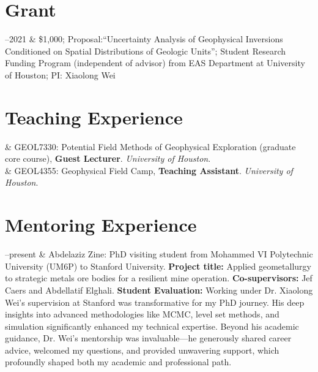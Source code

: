 \documentclass[11pt, a4paper]{article}
\newcommand{\Duration}[2]{\fontsize{10pt}{0}\selectfont #1--#2}
\newcommand{\Year}[1]{\fontsize{10pt}{0}\selectfont #1}
\begin{document}
\section*{Grant}
\begin{EntriesTable}
	
	\Duration{2020}{2021}  &
	\$1,000; Proposal:“Uncertainty Analysis of Geophysical Inversions Conditioned on Spatial Distributions of Geologic Units”; Student Research Funding Program (independent of advisor) from EAS Department at University of Houston; PI: Xiaolong Wei
	
\end{EntriesTable}


\section*{Teaching Experience}
\begin{EntriesTable}
	
	\Year{2020}  &
	GEOL7330: Potential Field Methods of Geophysical Exploration (graduate core course), \textbf{Guest Lecturer}. \emph{University of Houston}.
	\\
	\Year{2019}  &
	GEOL4355: Geophysical Field Camp, \textbf{Teaching Assistant}. \emph{University of Houston}.
	
\end{EntriesTable}


\section*{Mentoring Experience}
\begin{EntriesTable}
	
	\Duration{2024}{present}  &
	Abdelaziz Zine: PhD visiting student from Mohammed VI Polytechnic University (UM6P) to Stanford University. \textbf{Project title:} Applied geometallurgy to strategic metals ore bodies for a resilient mine operation. \textbf{Co-supervisors:} Jef Caers and Abdellatif Elghali. \textbf{Student Evaluation:} Working under Dr. Xiaolong Wei's supervision at Stanford was transformative for my PhD journey. His deep insights into advanced methodologies like MCMC, level set methods, and simulation significantly enhanced my technical expertise. Beyond his academic guidance, Dr. Wei’s mentorship was invaluable—he generously shared career advice, welcomed my questions, and provided unwavering support, which profoundly shaped both my academic and professional path.
	
\end{EntriesTable}
\end{document}
